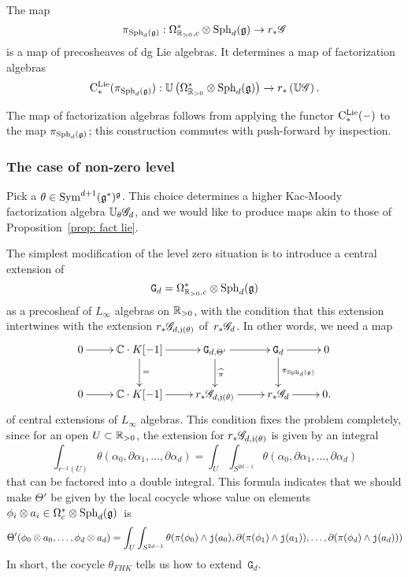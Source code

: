 \begin{prop}
\label{prop: fact lie}
The map
\[
 \pi_{{\rm Sph}_d(\mathfrak g)}: \Omega^*_{\mathbb R_{>0},c} \otimes {\rm Sph}_d(\mathfrak g) \to r_*\mathscr G 
\] 
is a map of precosheaves of dg Lie algebras.
It determines a map of factorization algebras
\[
{\rm C}^{\rm Lie}_*(\pi_{{\rm Sph}_d(\mathfrak g)}) : \mathbb U\left(\Omega^{*}_{\mathbb R_{>0}} \otimes {\rm Sph}_d(\mathfrak g)\right) \to r_*\left(\mathbb U \mathscr G \right) .
\]
\end{prop}

The map of factorization algebras follows from applying the functor ${\rm C}^{\rm Lie}_*(-)$ to the map $\pi_{{\rm Sph}_d(\mathfrak g)}$;
this construction commutes with push-forward by inspection. 

\subsubsection{The case of non-zero level}

Pick a $\theta \in {\rm Sym}^{d+1}(\mathfrak g^*)^\mathfrak g$. 
This choice determines a higher Kac-Moody factorization algebra $\mathbb U_\theta \mathscr G_d$,
and we would like to produce maps akin to those of Proposition~\ref{prop: fact lie}.

The simplest modification of the level zero situation is to introduce a central extension of 
\[
\mathtt{G}_d = \Omega^*_{\mathbb R_{>0},c} \otimes {\rm Sph}_d(\mathfrak g)
\] 
as a precosheaf of $L_\infty$ algebras on $\mathbb R_{>0}$,
with the condition that this extension intertwines with the extension $r_*\mathscr G_{d,\mathfrak j(\theta)}$ of~$r_* \mathscr G_{d}$.
In other words, we need a map 
\[
\xymatrix{
0 \ar[r] & \CC \cdot K [-1]  \ar[d]^{=} \ar[r] & \mathtt{G}_{d,\Theta'} \ar[d]^{\Hat{\pi}} \ar[r] & \mathtt{G}_d \ar[d]^{\pi_{\Sph_d(\fg)}} \ar[r] & 0 \\
0 \ar[r] & \CC \cdot K [-1] \ar[r] & r_*\sG_{d,\fj(\theta)} \ar[r] & r_* \sG_{d} \ar[r] & 0 .
}
\]
of central extensions of $L_\infty$ algebras.
This condition fixes the problem completely, 
since for an open $U \subset \mathbb R_{>0}$, the extension for $r_*\mathscr G_{d,\mathfrak j(\theta)}$ is given by an integral
\[
\int_{r^{-1}(U)} \theta(\alpha_0,\partial \alpha_1,\ldots,\partial \alpha_d) = \int_U \int_{S^{2d-1}} \theta(\alpha_0,\partial \alpha_1,\ldots,\partial \alpha_d)
\]
that can be factored into a double integral. 
This formula indicates that we should make $\Theta'$ be given by the local cocycle whose value on elements $\phi_i \otimes a_i \in \Omega^*_c \otimes {\rm Sph}_d(\mathfrak g)$~is
\begin{align*}
\Theta'(\phi_0 \otimes a_0, \ldots, \phi_d \otimes a_d)
&= \int_U \int_{S^{2d-1}} \theta(\pi(\phi_0) \wedge {\mathtt{j}}(a_0),\partial (\pi(\phi_1) \wedge {\mathtt{j}}(a_1)),\ldots,\partial(\pi(\phi_d) \wedge {\mathtt{j}}(a_d))) \\
\end{align*}
In short, the cocycle $\theta_{FHK}$ tells us how to extend~$\mathtt{G}_d$.

